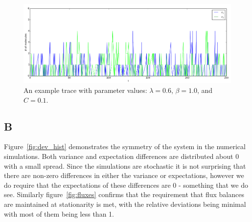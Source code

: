 \documentclass[a4paper,12pt]{article}
\begin{document}
\begin{figure}[!ht]
\centering
        \includegraphics[scale=0.45]{images/trace}
                \caption{An example trace with parameter values: $\lambda=0.6$, $\beta=1.0$, and $C=0.1$.}
                \label{fig:trace}
                
\end{figure}
        
\subsection*{B}
Figure~\ref{fig:dev_hist} demonstrates the symmetry of the system in the numerical simulations. Both variance and expectation differences are distributed about 0 with a small spread. Since the simulations are stochastic it is not surprising that there are non-zero differences in either the variance or expectations, however we do require that the expectations of these differences are 0  - something that we do see. Similarly figure~\ref{fig:fluxes} confirms that the requirement that flux balances are maintained at stationarity is met, with the relative deviations being minimal with most of them being less than 1.

\end{document}

